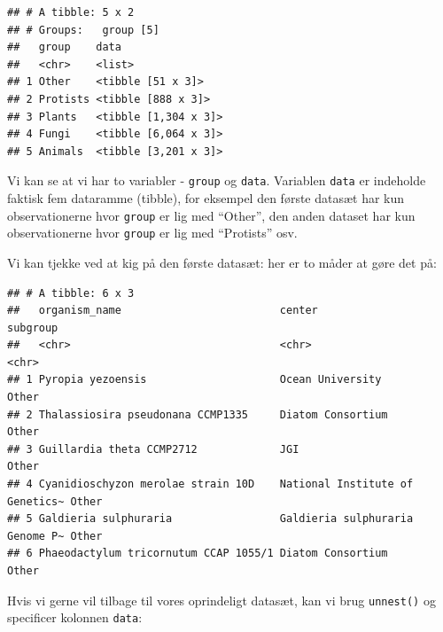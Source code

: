 \documentclass[
]{book}
\newenvironment{Shaded}{\begin{snugshade}}{\end{snugshade}}
\newcommand{\DecValTok}[1]{\textcolor[rgb]{0.00,0.00,0.81}{#1}}
\newcommand{\FunctionTok}[1]{\textcolor[rgb]{0.00,0.00,0.00}{#1}}
\newcommand{\NormalTok}[1]{#1}
\newcommand{\OtherTok}[1]{\textcolor[rgb]{0.56,0.35,0.01}{#1}}
\newcommand{\SpecialCharTok}[1]{\textcolor[rgb]{0.00,0.00,0.00}{#1}}
\newcommand{\StringTok}[1]{\textcolor[rgb]{0.31,0.60,0.02}{#1}}
\begin{document}
\begin{verbatim}
## # A tibble: 5 x 2
## # Groups:   group [5]
##   group    data                
##   <chr>    <list>              
## 1 Other    <tibble [51 x 3]>   
## 2 Protists <tibble [888 x 3]>  
## 3 Plants   <tibble [1,304 x 3]>
## 4 Fungi    <tibble [6,064 x 3]>
## 5 Animals  <tibble [3,201 x 3]>
\end{verbatim}

Vi kan se at vi har to variabler - \texttt{group} og \texttt{data}. Variablen \texttt{data} er indeholde faktisk fem dataramme (tibble), for eksempel den første datasæt har kun observationerne hvor \texttt{group} er lig med ``Other'', den anden dataset har kun observationerne hvor \texttt{group} er lig med ``Protists'' osv.

Vi kan tjekke ved at kig på den første datasæt: her er to måder at gøre det på:

\begin{Shaded}
\end{Shaded}

\begin{verbatim}
## # A tibble: 6 x 3
##   organism_name                         center                          subgroup
##   <chr>                                 <chr>                           <chr>   
## 1 Pyropia yezoensis                     Ocean University                Other   
## 2 Thalassiosira pseudonana CCMP1335     Diatom Consortium               Other   
## 3 Guillardia theta CCMP2712             JGI                             Other   
## 4 Cyanidioschyzon merolae strain 10D    National Institute of Genetics~ Other   
## 5 Galdieria sulphuraria                 Galdieria sulphuraria Genome P~ Other   
## 6 Phaeodactylum tricornutum CCAP 1055/1 Diatom Consortium               Other
\end{verbatim}

Hvis vi gerne vil tilbage til vores oprindeligt datasæt, kan vi brug \texttt{unnest()} og specificer kolonnen \texttt{data}:
\end{document}
